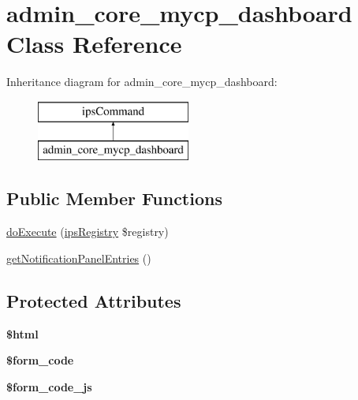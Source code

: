 \hypertarget{classadmin__core__mycp__dashboard}{\section{admin\-\_\-core\-\_\-mycp\-\_\-dashboard Class Reference}
\label{classadmin__core__mycp__dashboard}
}
Inheritance diagram for admin\-\_\-core\-\_\-mycp\-\_\-dashboard\-:\begin{figure}[H]
\begin{center}
\leavevmode
\includegraphics[height=2.000000cm]{classadmin__core__mycp__dashboard}
\end{center}
\end{figure}
\subsection*{Public Member Functions}
\begin{DoxyCompactItemize}
\item 
\hyperlink{classadmin__core__mycp__dashboard_afbc4e912a0604b94d47d66744c64d8ba}{do\-Execute} (\hyperlink{classips_registry}{ips\-Registry} \$registry)
\item 
\hyperlink{classadmin__core__mycp__dashboard_a1c04ebc14cd9ec0bc2a87706faa6e1c0}{get\-Notification\-Panel\-Entries} ()
\end{DoxyCompactItemize}
\subsection*{Protected Attributes}
\begin{DoxyCompactItemize}
\item 
\hypertarget{classadmin__core__mycp__dashboard_a6f96e7fc92441776c9d1cd3386663b40}{{\bfseries \$html}}\label{classadmin__core__mycp__dashboard_a6f96e7fc92441776c9d1cd3386663b40}

\item 
\hypertarget{classadmin__core__mycp__dashboard_af28aee726fa3eb6c355d08a2ab655e03}{{\bfseries \$form\-\_\-code}}\label{classadmin__core__mycp__dashboard_af28aee726fa3eb6c355d08a2ab655e03}

\item 
\hypertarget{classadmin__core__mycp__dashboard_ac68fe8a02a2efd63c3271179f4b4fbb7}{{\bfseries \$form\-\_\-code\-\_\-js}}\label{classadmin__core__mycp__dashboard_ac68fe8a02a2efd63c3271179f4b4fbb7}

\end{DoxyCompactItemize}
